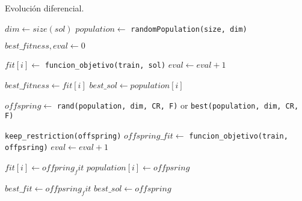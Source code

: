 \newpage
		\begin{algorithm}[H]
		\caption{Evolución diferencial.}
		\label{alg:ED}
		\begin{algorithmic}[1]
			
			\State $dim \gets size(sol)$
			\State $population \gets$ \texttt{randomPopulation(size, dim)}
			
			\State $best\_fitness, eval \gets 0$ 
			
			\State $fit[i] \gets$ \texttt{funcion\_objetivo(train, sol)} 
			\State $eval \gets eval + 1$
			
			\vspace{0.2cm}
			
			\State $best\_fitness \gets fit[i]$	
			\State $best\_sol \gets population[i]$			
			\EndIf
			\EndFor
			
			\vspace{0.3cm}
			
			\State $offspring \gets$ \texttt{rand(population, dim, CR, F)} or \texttt{best(population, dim, CR, F)} 
			
			\vspace{0.2cm}
			\State \texttt{keep\_restriction(offspring)}
			\State $offspring\_fit \gets$ \texttt{funcion\_objetivo(train, offpsring)}
			\State $eval \gets eval + 1$
			
			\vspace{0.2cm}
			
			 
			\State $fit[i] \gets offpring_fit$
			\State $population[i] \gets offpsring$
			\EndIf
			
			\vspace{0.2cm}				
			
			 
			\State $best\_fit \gets offpsring_fit$
			\State $best\_sol \gets offspring$
			\EndIf
			
			\EndFor
			\EndWhile
			
			
			
			
			\EndProcedure
		\end{algorithmic}
	\end{algorithm}		
	
